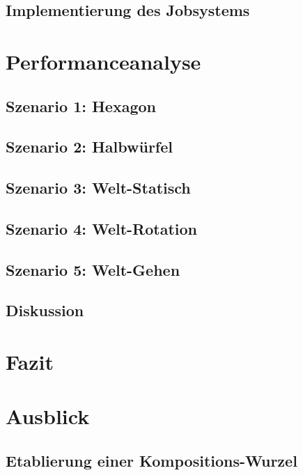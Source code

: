 \documentclass[12pt,a4paper,listof=toc,parskip=half,numbers=noenddot,abstract=true]{scrartcl}
\begin{document}
\subsection{Implementierung des Jobsystems}


\clearpage
\section{Performanceanalyse}\label{kap:performance}

\subsection{Szenario 1: Hexagon}

\subsection{Szenario 2: Halbwürfel}

\subsection{Szenario 3: Welt-Statisch}

\subsection{Szenario 4: Welt-Rotation}

\subsection{Szenario 5: Welt-Gehen}

\subsection{Diskussion}\label{sec:zusammenfassung}


\clearpage
\section{Fazit}\label{kap:Fazit}

\clearpage
\section{Ausblick}\label{kap:ausblick}

\subsection{Etablierung einer Kompositions-Wurzel}\label{sec:EtablierungEinerKompositionroot}

\end{document}

